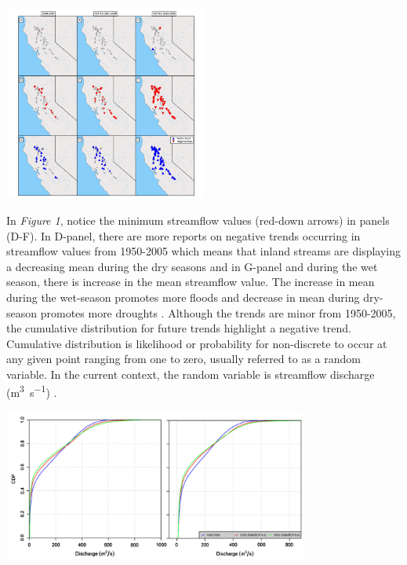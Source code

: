 \documentclass[a4paper,man,biblatex]{apa7}
\begin{document}
\begin{minipage}[c]{\textwidth}{
\centering   
    \includegraphics[width=0.5\textwidth]{stream_flow_cali}
    \label{fig:streamflow}
}\end{minipage}

\par In \textit{Figure 1}, notice the minimum streamflow values (red-down arrows) in panels (D-F). In D-panel, there are more reports on negative trends occurring in streamflow values from 1950-2005 which means that inland streams are displaying a decreasing mean during the dry seasons and in G-panel and during the wet season, there is increase in the mean streamflow value. The increase in mean during the wet-season promotes more floods and decrease in mean during dry-season promotes more droughts \autocite{mallakpour_2018}. Although the trends are minor from 1950-2005, the cumulative distribution for future trends highlight a negative trend. Cumulative distribution is likelihood or probability for non-discrete to occur at any given point ranging from one to zero, usually referred to as a random variable. In the current context, the random variable is streamflow discharge (\si{\cubic\meter\per\second}) \autocite{cdf_def}.\\

{\begin{minipage}[c]{\textwidth}
\centering   
    \includegraphics[width=0.75\textwidth]{cdf_streamflow}
    \label{fig:cdf}
\end{minipage}}
\vspace{-7pt}
\end{document}
